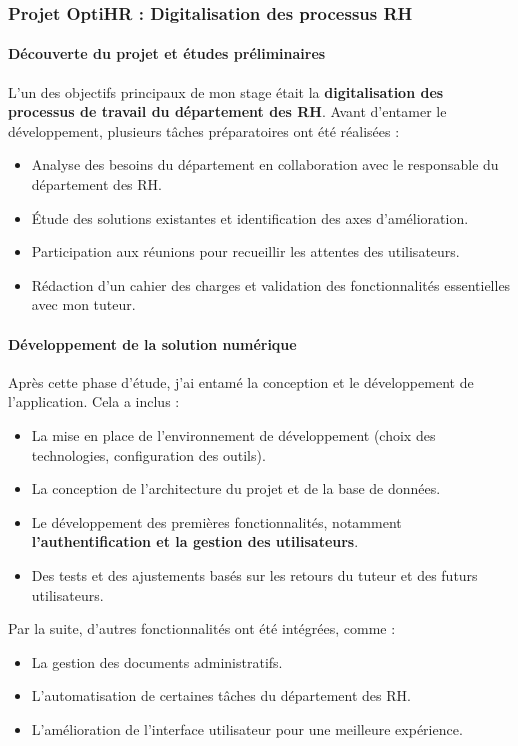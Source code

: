 \subsubsection{Projet OptiHR : Digitalisation des processus RH}

\paragraph{Découverte du projet et études préliminaires}
L'un des objectifs principaux de mon stage était la \textbf{digitalisation des processus de travail du département des \ac{RH}}. Avant d'entamer le développement, plusieurs tâches préparatoires ont été réalisées :

\begin{itemize}
    \item Analyse des besoins du département en collaboration avec le responsable du département des \ac{RH}.
    \item Étude des solutions existantes et identification des axes d'amélioration.
    \item Participation aux réunions pour recueillir les attentes des utilisateurs.
    \item Rédaction d'un cahier des charges et validation des fonctionnalités essentielles avec mon tuteur.
\end{itemize}

\paragraph{Développement de la solution numérique}
Après cette phase d'étude, j'ai entamé la conception et le développement de l'application. Cela a inclus :
\begin{itemize}
    \item La mise en place de l'environnement de développement (choix des technologies, configuration des outils).
    \item La conception de l'architecture du projet et de la base de données.
    \item Le développement des premières fonctionnalités, notamment \textbf{l'authentification et la gestion des utilisateurs}.
    \item Des tests et des ajustements basés sur les retours du tuteur et des futurs utilisateurs.
\end{itemize}

Par la suite, d'autres fonctionnalités ont été intégrées, comme :

\begin{itemize}
    \item La gestion des documents administratifs.
    \item L'automatisation de certaines tâches du département des \ac{RH}.
    \item L'amélioration de l'interface utilisateur pour une meilleure expérience.
\end{itemize}

